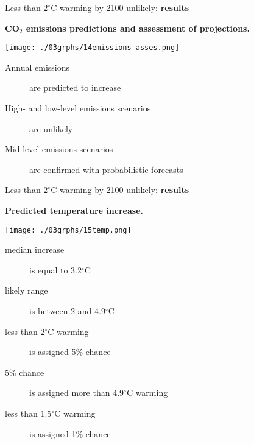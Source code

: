 \documentclass[notes,blackandwhite,mathsans,usenames,dvipsnames]{beamer}
\begin{document}
\begin{frame}{Less than $2^{\circ}$C warming by 2100 unlikely: \textbf{results}}

\textbf{CO$_2$ emissions predictions and assessment of projections.}
\begin{center}
\texttt{[image: ./03grphs/14emissions-asses.png]}
\end{center}
\begin{description}
\item[Annual emissions] are predicted to increase

\item[High- and low-level emissions scenarios] are unlikely

\item[Mid-level emissions scenarios] are confirmed with probabilistic forecasts
\end{description}

\end{frame}







\begin{frame}{Less than $2^{\circ}$C warming by 2100 unlikely: \textbf{results}}

\textbf{Predicted temperature increase.}
\begin{center}
\begin{multicols}{2}
\texttt{[image: ./03grphs/15temp.png]}

\begin{description}
\item[median increase] is equal to 3.2$^\circ$C
\item[likely range] is between 2 and 4.9$^\circ$C

\item[less than 2$^\circ$C warming] is assigned 5\% chance
\item[5\% chance] is assigned more than 4.9$^\circ$C warming

\item[less than 1.5$^\circ$C warming] is assigned 1\% chance
\end{description}
\end{multicols}
\end{center}
\end{frame}
\end{document}
